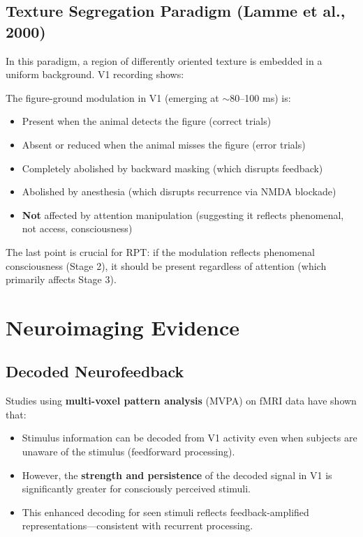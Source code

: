 \documentclass[11pt,a4paper]{report}
\begin{document}
\subsection{Texture Segregation Paradigm (Lamme et al., 2000)}

In this paradigm, a region of differently oriented texture is embedded in a uniform background. V1 recording shows:

\begin{predbox}
The figure-ground modulation in V1 (emerging at $\sim$80--100 ms) is:
\begin{itemize}[leftmargin=1.5em]
  \item Present when the animal detects the figure (correct trials)
  \item Absent or reduced when the animal misses the figure (error trials)
  \item Completely abolished by backward masking (which disrupts feedback)
  \item Abolished by anesthesia (which disrupts recurrence via NMDA blockade)
  \item \textbf{Not} affected by attention manipulation (suggesting it reflects phenomenal, not access, consciousness)
\end{itemize}
\end{predbox}

The last point is crucial for RPT: if the modulation reflects phenomenal consciousness (Stage 2), it should be present regardless of attention (which primarily affects Stage 3).

\section{Neuroimaging Evidence}

\subsection{Decoded Neurofeedback}

Studies using \textbf{multi-voxel pattern analysis} (MVPA) on fMRI data have shown that:
\begin{itemize}[leftmargin=1.5em]
  \item Stimulus information can be decoded from V1 activity even when subjects are unaware of the stimulus (feedforward processing).
  \item However, the \textbf{strength and persistence} of the decoded signal in V1 is significantly greater for consciously perceived stimuli.
  \item This enhanced decoding for seen stimuli reflects feedback-amplified representations---consistent with recurrent processing.
\end{itemize}
\end{document}
